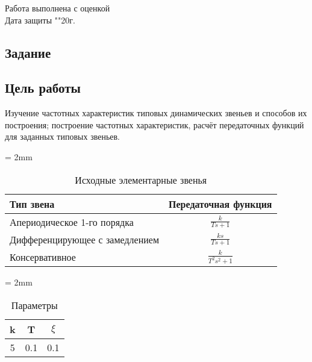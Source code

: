 \documentclass[a4paper, 11pt]{article}
\begin{document}
\begin{titlepage}
		Работа выполнена с оценкой \hspace{1cm} \underline{\hspace{8cm}} \\ 
		\vspace{1cm}
		Дата защиты "\underline{\hspace{0.7cm}}"\hspace{0.2cm}\underline{\hspace{2cm}}\hspace{0.2cm}20\underline{\hspace{0.7cm}}г.

\end{titlepage}

\begin{center}
\section*{Задание}
\end{center}

\subsection*{Цель работы} 
\par
Изучение частотных характеристик типовых динамических звеньев и способов их построения; построение частотных характеристик, расчёт передаточных функций для заданных типовых звеньев.

\begin{table}[h!]
\centering
    \tabulinesep = 2mm

    \begin{threeparttable}
    	\caption{Исходные элементарные звенья}
    	\begin{tabular} {|l|c|}
        \hline
        	Тип звена & Передаточная функция \\ [0.5cm]  \hline
        	Апериодическое 1-го порядка & $\displaystyle\frac{k}{Ts + 1}$ \\ [0.5cm]  \hline
        	Дифференцирующее с замедлением & $\displaystyle\frac{ks}{Ts + 1}$ \\ [0.5cm]  \hline
        	Консервативное & $\displaystyle\frac{k}{T^2s^2+1}$ \\ [0.5cm] \hline
    	\end{tabular}
    \end{threeparttable} 
\end{table}

\begin{table}[h!]
\centering
	\begin{threeparttable}
    \tabulinesep = 2mm
    	\caption{Параметры}\label{tab:perflogcross}
    	\begin{tabular}{|c|c|c|}
    		\hline
        	k & T & $\xi$ \\ \hline
        	5 & 0.1 & 0.1 \\
        	\hline
    	\end{tabular}
    \end{threeparttable}
\end{table}
\end{document}
